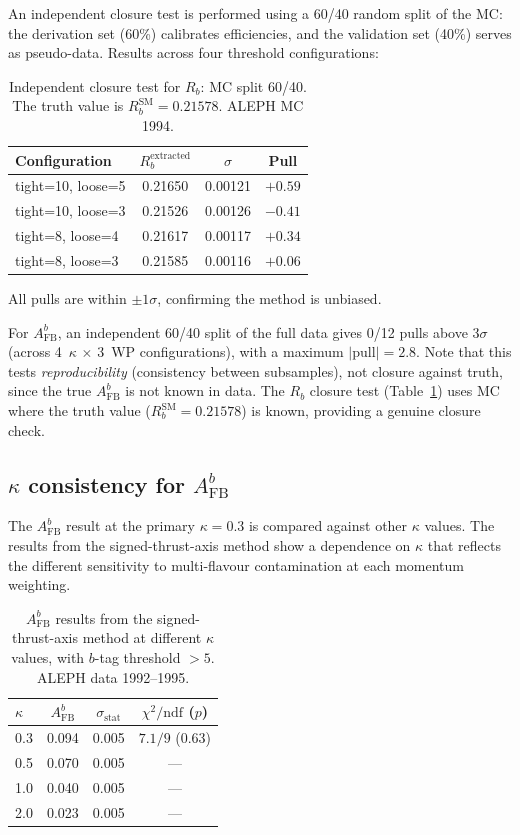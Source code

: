 \documentclass[11pt,a4paper]{article}
\begin{document}
An independent closure test is performed using a 60/40 random split of
the MC: the derivation set (60\%) calibrates efficiencies, and the
validation set (40\%) serves as pseudo-data.  Results across four
threshold configurations:

\begin{table}[htbp]
\centering
\caption{Independent closure test for $R_b$: MC split 60/40.  The truth
  value is $R_b^\mathrm{SM} = 0.21578$.  ALEPH MC 1994.}
\label{tbl:closure}
\begin{tabular}{lccc}
\toprule
Configuration & $R_b^\mathrm{extracted}$ & $\sigma$ & Pull \\
\midrule
tight=10, loose=5 & 0.21650 & 0.00121 & $+0.59$ \\
tight=10, loose=3 & 0.21526 & 0.00126 & $-0.41$ \\
tight=8, loose=4  & 0.21617 & 0.00117 & $+0.34$ \\
tight=8, loose=3  & 0.21585 & 0.00116 & $+0.06$ \\
\bottomrule
\end{tabular}
\end{table}

All pulls are within $\pm 1\sigma$, confirming the method is unbiased.

For $A_\mathrm{FB}^b$, an independent 60/40 split of the full data
gives 0/12 pulls above $3\sigma$ (across 4~$\kappa$ $\times$ 3~WP
configurations), with a maximum $|\mathrm{pull}| = 2.8$.
Note that this tests \emph{reproducibility} (consistency between
subsamples), not closure against truth, since the true $A_\mathrm{FB}^b$
is not known in data.  The $R_b$ closure test (Table~\ref{tbl:closure})
uses MC where the truth value ($R_b^\mathrm{SM} = 0.21578$) is known,
providing a genuine closure check.

\subsection{$\kappa$ consistency for $A_\mathrm{FB}^b$}
\label{sec:xcheck-kappa}

The $A_\mathrm{FB}^b$ result at the primary $\kappa = 0.3$ is compared
against other $\kappa$ values.  The results from the signed-thrust-axis
method show a dependence on $\kappa$ that reflects the different
sensitivity to multi-flavour contamination at each momentum weighting.

\begin{table}[htbp]
\centering
\caption{$A_\mathrm{FB}^b$ results from the signed-thrust-axis method
  at different $\kappa$ values, with $b$-tag threshold $> 5$.
  ALEPH data 1992--1995.}
\label{tbl:kappa-consistency}
\begin{tabular}{lccc}
\toprule
$\kappa$ & $A_\mathrm{FB}^b$ & $\sigma_\mathrm{stat}$ & $\chi^2/\mathrm{ndf}$ ($p$) \\
\midrule
0.3 & 0.094 & 0.005 & $7.1/9$ (0.63) \\
0.5 & 0.070 & 0.005 & --- \\
1.0 & 0.040 & 0.005 & --- \\
2.0 & 0.023 & 0.005 & --- \\
\bottomrule
\end{tabular}
\end{table}
\end{document}
